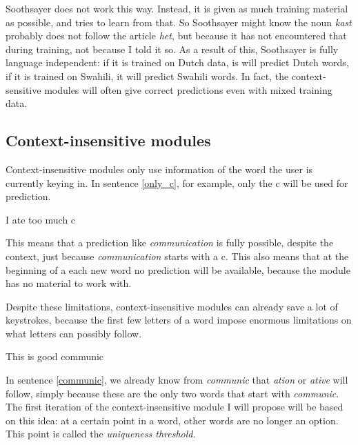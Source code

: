 \documentclass[12pt]{article}
\begin{document}
\begin{itemize}
Soothsayer does not work this way. Instead, it is given as much training material as possible, and tries to learn from that. So Soothsayer might know the noun \emph{kast} probably does not follow the article \emph{het}, but because it has not encountered that during training, not because I told it so. As a result of this, Soothsayer is fully language independent: if it is trained on Dutch data, is will predict Dutch words, if it is trained on Swahili, it will predict Swahili words. In fact, the context-sensitive modules will often give correct predictions even with mixed training data.

\end{itemize}

\subsection{Context-insensitive modules} \label{ci}

Context-insensitive modules only use information of the word the user is currently keying in. In sentence \ref{only_c}, for example, only the c will be used for prediction. 

\begin{examples}
\item I ate too much c \label{only_c}
\end{examples}

This means that a prediction like \emph{communication} is fully possible, despite the context, just because \emph{communication} starts with a c. This also means that at the beginning of a each new word no prediction will be available, because the module has no material to work with.

Despite these limitations, context-insensitive modules can already save a lot of keystrokes, because the first few letters of a word impose enormous limitations on what letters can possibly follow.

\begin{examples}
\item This is good communic \label{communic}
\end{examples}

In sentence \ref{communic}, we already know from \emph{communic} that \emph{ation} or \emph{ative} will follow, simply because these are the only two words that start with \emph{communic}. The first iteration of the context-insensitive module I will propose will be based on this idea: at a certain point in a word, other words are no longer an option. This point is called the \emph{uniqueness threshold}.
\end{document}
